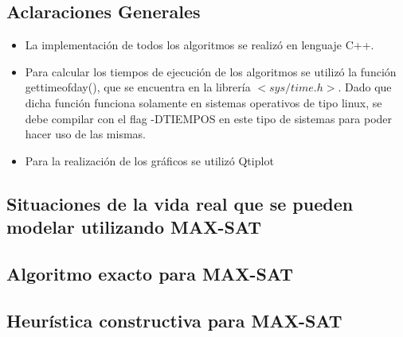 \documentclass[a4paper,10pt]{article}
\begin{document}
\tableofcontents

\newpage


\begin{center}
\section*{Aclaraciones Generales}

\begin{itemize}
\item La implementación de todos los algoritmos se realizó en lenguaje C++.

\item Para calcular los tiempos de ejecución de los algoritmos se utilizó la función gettimeofday(), que se encuentra en la librería $<sys/time.h>$. Dado que dicha función funciona solamente en sistemas operativos de tipo linux, se debe compilar con el flag -DTIEMPOS en este tipo de sistemas para poder hacer uso de las mismas.

\item Para la realización de los gráficos se utilizó Qtiplot
\end{itemize}

\end{center}

\newpage

\begin{center}
\section*{Situaciones de la vida real que se pueden modelar utilizando MAX-SAT}
\end{center}


\begin{center}
\section*{Algoritmo exacto para MAX-SAT}
\end{center}


\begin{center}
\section*{Heur\'istica constructiva para MAX-SAT}
\end{center}
\end{document}
